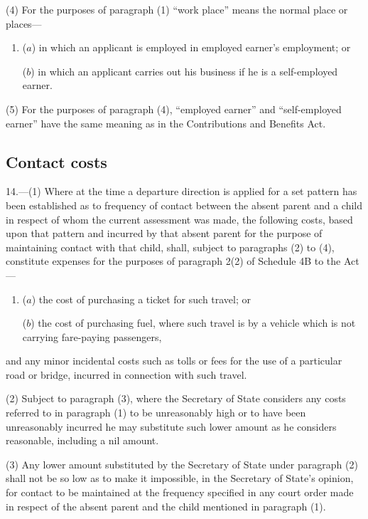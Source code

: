 \documentclass[a4paper]{article}
\begin{document}
(4) For the purposes of paragraph (1) “work place” means the normal place or places—
\begin{enumerate}\item[]
($a$) in which an applicant is employed in employed earner’s employment; or

($b$) in which an applicant carries out his business if he is a self-employed earner.
\end{enumerate}

(5) For the purposes of paragraph (4), “employed earner” and “self-\hspace{0pt}employed earner” have the same meaning as in the Contributions and Benefits Act.

\subsection[14. Contact costs]{Contact costs}

14.—(1) Where at the time a departure direction is applied for a set pattern has been established as to frequency of contact between the absent parent and a child in respect of whom the current assessment was made, the following costs, based upon that pattern and incurred by that absent parent for the purpose of maintaining contact with that child, shall, subject to paragraphs (2) to (4), constitute expenses for the purposes of paragraph 2(2) of Schedule 4B to the Act—
\begin{enumerate}\item[]
($a$) the cost of purchasing a ticket for such travel; or

($b$) the cost of purchasing fuel, where such travel is by a vehicle which is not carrying fare-paying passengers,
\end{enumerate}
and any minor incidental costs such as tolls or fees for the use of a particular road or bridge, incurred in connection with such travel.

(2) Subject to paragraph (3), where the Secretary of State considers any costs referred to in paragraph (1) to be unreasonably high or to have been unreasonably incurred he may substitute such lower amount as he considers reasonable, including a nil amount.

(3) Any lower amount substituted by the Secretary of State under paragraph (2) shall not be so low as to make it impossible, in the Secretary of State’s opinion, for contact to be maintained at the frequency specified in any court order made in respect of the absent parent and the child mentioned in paragraph (1).
\end{document}

